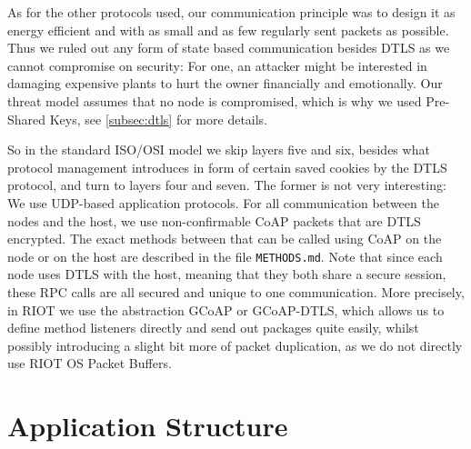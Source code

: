 \documentclass[acmtog, language=english, nonacm]{acmart}
\begin{document}
    As for the other protocols used, our communication principle was to design it as energy efficient and with as small and as few regularly sent packets as possible. Thus we ruled out any form of state based communication besides DTLS as we cannot compromise on security: For one, an attacker might be interested in damaging expensive plants to hurt the owner financially and emotionally. Our threat model assumes that no node is compromised, which is why we used Pre-Shared Keys, see \cref{subsec:dtls} for more details.

    So in the standard ISO/OSI model we skip layers five and six, besides what protocol management introduces in form of certain saved cookies by the DTLS protocol, and turn to layers four and seven. The former is not very interesting: We use UDP-based application protocols. For all communication between the nodes and the host, we use non-confirmable CoAP packets that are DTLS encrypted. The exact methods between that can be called using CoAP on the node or on the host are described in the file \texttt{METHODS.md}. Note that since each node uses DTLS with the host, meaning that they both share a secure session, these RPC calls are all secured and unique to one communication. More precisely, in RIOT we use the abstraction GCoAP or GCoAP-DTLS, which allows us to define method listeners directly and send out packages quite easily, whilst possibly introducing a slight bit more of packet duplication, as we do not directly use RIOT OS Packet Buffers.

    \section{Application Structure}
\end{document}
